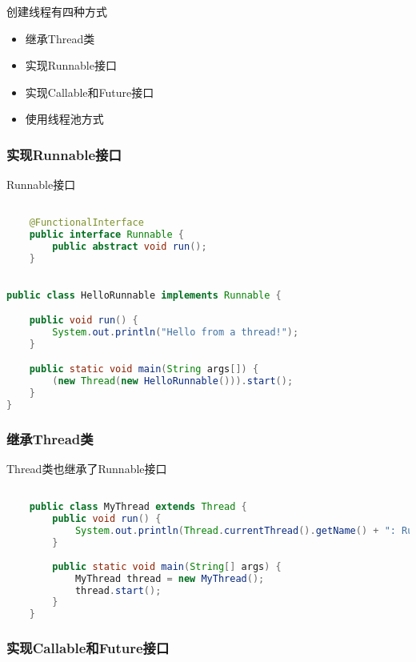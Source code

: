 创建线程有四种方式

\begin{itemize}
    \item  继承Thread类 
    \item  实现Runnable接口
    \item  实现Callable和Future接口
    \item  使用线程池方式
\end{itemize}


\subsubsection{实现Runnable接口}

Runnable接口

\begin{lstlisting}[language=java]

    @FunctionalInterface
    public interface Runnable {
        public abstract void run();
    }

\end{lstlisting}

\begin{lstlisting}[language=java]

public class HelloRunnable implements Runnable {

    public void run() {
        System.out.println("Hello from a thread!");
    }

    public static void main(String args[]) {
        (new Thread(new HelloRunnable())).start();
    }
}

\end{lstlisting}

\subsubsection{继承Thread类}

Thread类也继承了Runnable接口

\begin{lstlisting}[language=java]

    public class MyThread extends Thread {
        public void run() {
            System.out.println(Thread.currentThread().getName() + ": Run!!!");
        }
    
        public static void main(String[] args) {
            MyThread thread = new MyThread();
            thread.start();
        }
    }

\end{lstlisting}

\subsubsection{实现Callable和Future接口}

